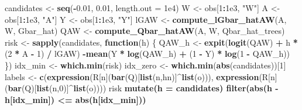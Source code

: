 \documentclass[11pt,openright,twoside]{book}
\newenvironment{Shaded}{\begin{snugshade}}{\end{snugshade}}
\newcommand{\ControlFlowTok}[1]{\textcolor[rgb]{0.13,0.29,0.53}{\textbf{#1}}}
\newcommand{\DataTypeTok}[1]{\textcolor[rgb]{0.13,0.29,0.53}{#1}}
\newcommand{\DecValTok}[1]{\textcolor[rgb]{0.00,0.00,0.81}{#1}}
\newcommand{\FloatTok}[1]{\textcolor[rgb]{0.00,0.00,0.81}{#1}}
\newcommand{\KeywordTok}[1]{\textcolor[rgb]{0.13,0.29,0.53}{\textbf{#1}}}
\newcommand{\NormalTok}[1]{#1}
\newcommand{\OperatorTok}[1]{\textcolor[rgb]{0.81,0.36,0.00}{\textbf{#1}}}
\newcommand{\StringTok}[1]{\textcolor[rgb]{0.31,0.60,0.02}{#1}}
\theoremstyle{definition}
\theoremstyle{definition}
\theoremstyle{definition}
\theoremstyle{remark}
\begin{document}
\begin{Shaded}
\begin{Highlighting}[]
\NormalTok{candidates <-}\StringTok{ }\KeywordTok{seq}\NormalTok{(}\OperatorTok{-}\FloatTok{0.01}\NormalTok{, }\FloatTok{0.01}\NormalTok{, }\DataTypeTok{length.out =} \FloatTok{1e4}\NormalTok{)}
\NormalTok{W <-}\StringTok{ }\NormalTok{obs[}\DecValTok{1}\OperatorTok{:}\FloatTok{1e3}\NormalTok{, }\StringTok{"W"}\NormalTok{]}
\NormalTok{A <-}\StringTok{ }\NormalTok{obs[}\DecValTok{1}\OperatorTok{:}\FloatTok{1e3}\NormalTok{, }\StringTok{"A"}\NormalTok{]}
\NormalTok{Y <-}\StringTok{ }\NormalTok{obs[}\DecValTok{1}\OperatorTok{:}\FloatTok{1e3}\NormalTok{, }\StringTok{"Y"}\NormalTok{]}
\NormalTok{lGAW <-}\StringTok{ }\KeywordTok{compute_lGbar_hatAW}\NormalTok{(A, W, Gbar_hat)}
\NormalTok{QAW <-}\StringTok{ }\KeywordTok{compute_Qbar_hatAW}\NormalTok{(A, W, Qbar_hat_trees)}
\NormalTok{risk <-}\StringTok{ }\KeywordTok{sapply}\NormalTok{(candidates,}
               \ControlFlowTok{function}\NormalTok{(h) \{}
\NormalTok{                 QAW_h <-}\StringTok{ }\KeywordTok{expit}\NormalTok{(}\KeywordTok{logit}\NormalTok{(QAW)  }\OperatorTok{+}\StringTok{ }\NormalTok{h }\OperatorTok{*}\StringTok{ }\NormalTok{(}\DecValTok{2} \OperatorTok{*}\StringTok{ }\NormalTok{A }\OperatorTok{-}\StringTok{ }\DecValTok{1}\NormalTok{) }\OperatorTok{/}\StringTok{ }\NormalTok{lGAW)}
                 \OperatorTok{-}\KeywordTok{mean}\NormalTok{(Y }\OperatorTok{*}\StringTok{ }\KeywordTok{log}\NormalTok{(QAW_h) }\OperatorTok{+}\StringTok{ }\NormalTok{(}\DecValTok{1} \OperatorTok{-}\StringTok{ }\NormalTok{Y) }\OperatorTok{*}\StringTok{ }\KeywordTok{log}\NormalTok{(}\DecValTok{1} \OperatorTok{-}\StringTok{ }\NormalTok{QAW_h))}
\NormalTok{               \})}
\NormalTok{idx_min <-}\StringTok{ }\KeywordTok{which.min}\NormalTok{(risk)}
\NormalTok{idx_zero <-}\StringTok{ }\KeywordTok{which.min}\NormalTok{(}\KeywordTok{abs}\NormalTok{(candidates))[}\DecValTok{1}\NormalTok{]}
\NormalTok{labels <-}\StringTok{ }\KeywordTok{c}\NormalTok{(}\KeywordTok{expression}\NormalTok{(R[n](}\KeywordTok{bar}\NormalTok{(Q)[}\KeywordTok{list}\NormalTok{(n,hn)]}\OperatorTok{^}\KeywordTok{list}\NormalTok{(o))),}
            \KeywordTok{expression}\NormalTok{(R[n](}\KeywordTok{bar}\NormalTok{(Q)[}\KeywordTok{list}\NormalTok{(n,}\DecValTok{0}\NormalTok{)]}\OperatorTok{^}\KeywordTok{list}\NormalTok{(o))))}
\NormalTok{risk }\OperatorTok{%
\StringTok{  }\KeywordTok{mutate}\NormalTok{(}\DataTypeTok{h =}\NormalTok{ candidates) }\OperatorTok{%
\StringTok{  }\KeywordTok{filter}\NormalTok{(}\KeywordTok{abs}\NormalTok{(h }\OperatorTok{-}\StringTok{ }\NormalTok{h[idx_min]) }\OperatorTok{<=}\StringTok{ }\KeywordTok{abs}\NormalTok{(h[idx_min])) }\OperatorTok{%
}}}
\end{Highlighting}
\end{Shaded}
\end{document}
